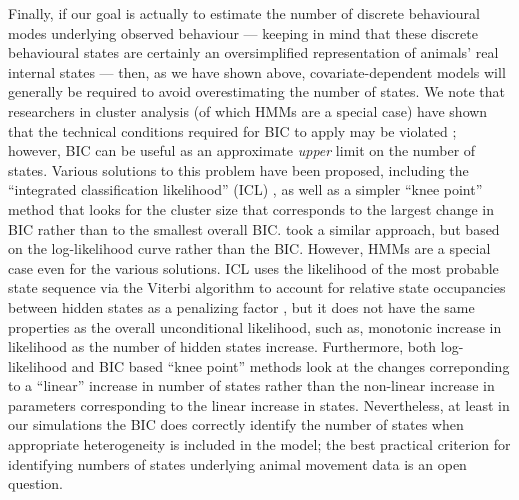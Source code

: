 \documentclass{bmcart}
\begin{document}
Finally, if our goal is actually to estimate the number of discrete
behavioural modes underlying observed behaviour --- keeping in mind
that these discrete behavioural states are certainly an oversimplified
representation of animals' real internal states --- then, as we have
shown above, covariate-dependent models will generally be required to
avoid overestimating the number of states.  We note that researchers
in cluster analysis (of which HMMs are a special case) have shown that
the technical conditions required for BIC to apply may be violated
\cite{biernacki2000assessing}; however, BIC can be useful as an
approximate \emph{upper} limit on the number of states. Various
solutions to this problem have been proposed, including the
``integrated classification likelihood'' (ICL)
\cite{biernacki2000assessing}, as well as a simpler ``knee point''
method \cite{zhao_knee_2008} that looks for the cluster size that
corresponds to the largest change in BIC rather than to the smallest
overall BIC.  \cite{dean2012behavioural} took a similar approach, but
based on the log-likelihood curve rather than the BIC. However, HMMs are 
a special case even for the various solutions. ICL uses the likelihood of the 
most probable state sequence via the Viterbi algorithm to account for relative 
state occupancies between hidden states as a penalizing factor \cite{celeux2008selecting}, but it does
not have the same properties as the overall unconditional likelihood, such as, 
monotonic increase in likelihood as the number of hidden states increase. Furthermore, 
both log-likelihood and BIC based ``knee point'' methods look at the changes correponding to
a ``linear'' increase in number of states rather than the non-linear increase in parameters
corresponding to the linear increase in states. 
Nevertheless, at least in our simulations the BIC does correctly identify
the number of states when appropriate heterogeneity is included
in the model; the best practical criterion for identifying 
numbers of states underlying animal movement data is an open question.
\end{document}
